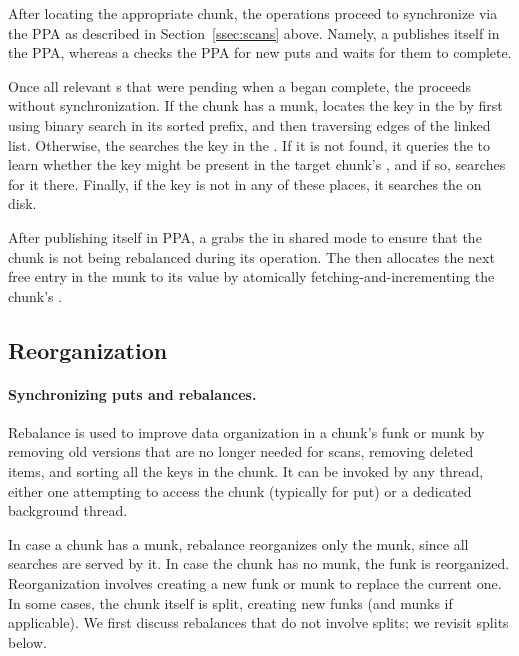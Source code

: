 After locating the appropriate chunk, the operations proceed to synchronize via the PPA as described in Section~\ref{ssec:scans} above. Namely, a  publishes itself in the PPA, whereas a  
checks the PPA for new puts and waits for them to complete. 

Once all relevant s that were pending when a   began complete, the 
 proceeds without synchronization. If the chunk has a munk,     locates the key in the
  by first using binary search in its sorted prefix, and then traversing edges of the linked list. 
Otherwise, the  searches the key in the . If it is not found, it queries 
the  to learn whether the key might be present in the target chunk's  
 , and if so, searches for it there.  Finally, if the key is not in any of these places, it searches
 the   on disk.

After publishing itself in PPA, a  grabs the  in shared mode to ensure that the chunk is not being rebalanced during its operation. The  then allocates the next free entry in 
the munk to its value by atomically fetching-and-incrementing the chunk's . 




\subsection{Reorganization}
\label{ssec:rebalance}

\paragraph{Synchronizing puts and rebalances.}

Rebalance is used to improve data organization in a chunk's funk or munk by removing old versions that are no longer needed for scans, 
removing deleted items, and sorting all the keys in the chunk. 
It can be invoked by any thread, either one attempting to access the chunk (typically for put) or a dedicated background thread.

In case a chunk has a munk, rebalance reorganizes only  the munk, since all searches are served by it. In case the chunk has no munk, the funk is reorganized. Reorganization involves creating a new funk or munk 
to replace the  current one.  In some cases, the chunk itself is split, creating new funks (and munks if applicable). We first discuss 
rebalances that do not involve splits; we revisit splits below.

